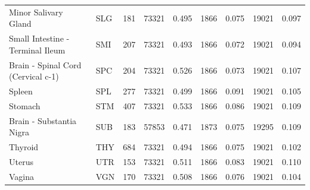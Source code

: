 \begin{tabular}{llrrlrlrl}
Minor Salivary Gland & SLG & 181 & 73321 & 0.495 & 1866 & 0.075 & 19021 & 0.097 \\
Small Intestine - Terminal Ileum & SMI & 207 & 73321 & 0.493 & 1866 & 0.072 & 19021 & 0.094 \\
Brain - Spinal Cord (Cervical c-1) & SPC & 204 & 73321 & 0.526 & 1866 & 0.073 & 19021 & 0.107 \\
Spleen & SPL & 277 & 73321 & 0.499 & 1866 & 0.091 & 19021 & 0.105 \\
Stomach & STM & 407 & 73321 & 0.533 & 1866 & 0.086 & 19021 & 0.109 \\
Brain - Substantia Nigra & SUB & 183 & 57853 & 0.471 & 1873 & 0.075 & 19295 & 0.109 \\
Thyroid & THY & 684 & 73321 & 0.494 & 1866 & 0.075 & 19021 & 0.102 \\
Uterus & UTR & 153 & 73321 & 0.511 & 1866 & 0.083 & 19021 & 0.110 \\
Vagina & VGN & 170 & 73321 & 0.508 & 1866 & 0.076 & 19021 & 0.104 \\
\bottomrule
\end{tabular}

